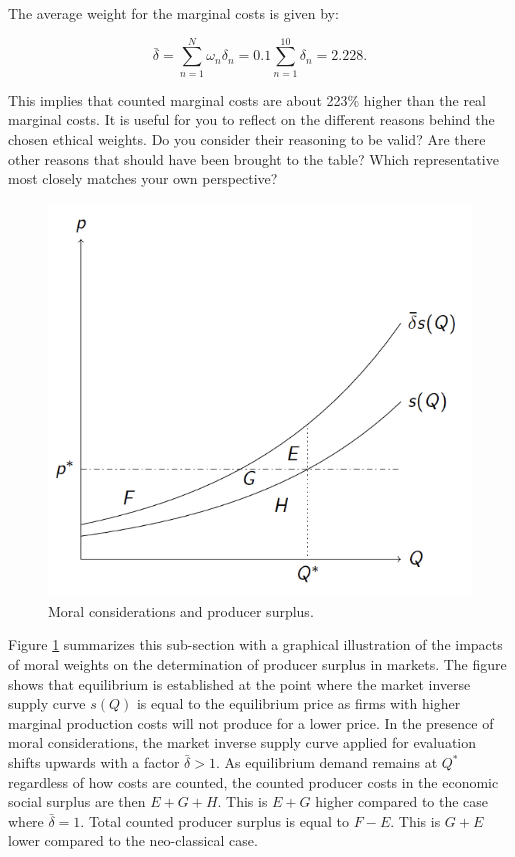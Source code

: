 \documentclass[
]{book}
\begin{document}
The average weight for the marginal costs is given by:

\begin{equation}
 \bar{\delta} = \sum_{n=1}^N \omega_n \delta_n = 0.1 \sum_{n=1}^{10} \delta_n = 2.228.
\end{equation}

This implies that counted marginal costs are about 223\% higher than the real marginal costs. It is useful for you to reflect on the different reasons behind the chosen ethical weights. Do you consider their reasoning to be valid? Are there other reasons that should have been brought to the table? Which representative most closely matches your own perspective?

\begin{figure}
\includegraphics[width=7.61in]{./figures/psmoral} \caption{Moral considerations and producer surplus.}\label{fig:psmoral}
\end{figure}

Figure \ref{fig:psmoral} summarizes this sub-section with a graphical illustration of the impacts of moral weights on the determination of producer surplus in markets. The figure shows that equilibrium is established at the point where the market inverse supply curve \(s(Q)\) is equal to the equilibrium price as firms with higher marginal production costs will not produce for a lower price. In the presence of moral considerations, the market inverse supply curve applied for evaluation shifts upwards with a factor \(\bar{\delta} > 1\). As equilibrium demand remains at \(Q^*\) regardless of how costs are counted, the counted producer costs in the economic social surplus are then \(E+G+H\). This is \(E+G\) higher compared to the case where \(\bar{\delta}= 1\). Total counted producer surplus is equal to \(F-E\). This is \(G+E\) lower compared to the neo-classical case.
\end{document}
